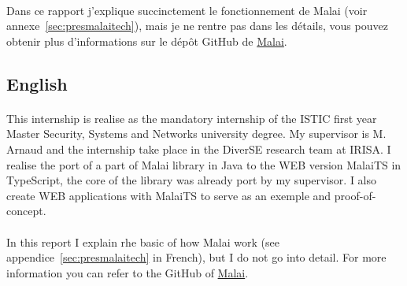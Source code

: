 \documentclass[11pt, a4paper, pdftex]{article}
\begin{document}
            \paragraph{}
                Dans ce rapport j'explique succinctement le fonctionnement de Malai (voir annexe~\ref{sec:presmalaitech}), mais je ne rentre pas dans les détails, vous pouvez obtenir plus d'informations sur le dépôt GitHub de \href{https://github.com/arnobl/Malai}{Malai}.

        \subsection{English}\label{subsec:eng}
            \paragraph{}
                This internship is realise as the mandatory internship of the ISTIC first year Master Security, Systems and Networks university degree.
                My supervisor is M. Arnaud  and the internship take place in the DiverSE research team at IRISA\@.
                I realise the port of a part of Malai library in Java to the WEB version MalaiTS in TypeScript, the core of the library was already port by my supervisor.
                I also create WEB applications with MalaiTS to serve as an exemple and proof-of-concept.

            \paragraph{}
                In this report I explain rhe basic of how Malai work (see appendice~\ref{sec:presmalaitech} in French), but I do not go into detail. For more information you can refer to the GitHub of \href{https://github.com/arnobl/Malai}{Malai}.

    \newpage

\end{document}
